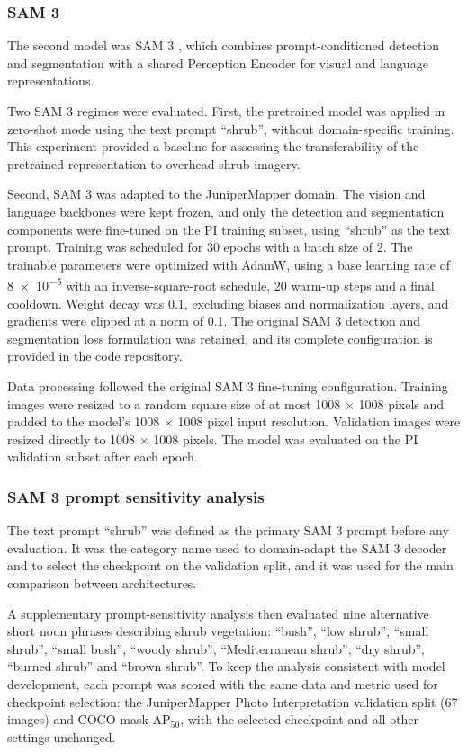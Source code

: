 \documentclass[12pt,a4paper]{article}
\begin{document}
\subsubsection{SAM 3}

The second model was SAM 3 \citep{carion2026sam3}, which combines prompt-conditioned detection and segmentation with a shared Perception Encoder for visual and language representations.

Two SAM 3 regimes were evaluated. First, the pretrained model was applied in zero-shot mode using the text prompt ``shrub'', without domain-specific training. This experiment provided a baseline for assessing the transferability of the pretrained representation to overhead shrub imagery.

Second, SAM 3 was adapted to the JuniperMapper domain. The vision and language backbones were kept frozen, and only the detection and segmentation components were fine-tuned on the PI training subset, using ``shrub'' as the text prompt. Training was scheduled for 30 epochs with a batch size of 2. The trainable parameters were optimized with AdamW, using a base learning rate of \num{8e-5} with an inverse-square-root schedule, 20 warm-up steps and a final cooldown. Weight decay was 0.1, excluding biases and normalization layers, and gradients were clipped at a norm of 0.1. The original SAM 3 detection and segmentation loss formulation was retained, and its complete configuration is provided in the code repository.

Data processing followed the original SAM 3 fine-tuning configuration. Training images were resized to a random square size of at most 1008 $\times$ 1008 pixels and padded to the model's 1008 $\times$ 1008 pixel input resolution. Validation images were resized directly to 1008 $\times$ 1008 pixels. The model was evaluated on the PI validation subset after each epoch.

\subsubsection{SAM 3 prompt sensitivity analysis}

The text prompt ``shrub'' was defined as the primary SAM 3 prompt before any evaluation. It was the category name used to domain-adapt the SAM 3 decoder and to select the checkpoint on the validation split, and it was used for the main comparison between architectures.

A supplementary prompt-sensitivity analysis then evaluated nine alternative short noun phrases describing shrub vegetation: ``bush'', ``low shrub'', ``small shrub'', ``small bush'', ``woody shrub'', ``Mediterranean shrub'', ``dry shrub'', ``burned shrub'' and ``brown shrub''. To keep the analysis consistent with model development, each prompt was scored with the same data and metric used for checkpoint selection: the JuniperMapper Photo Interpretation validation split (67 images) and COCO mask AP$_{50}$, with the selected checkpoint and all other settings unchanged.
\end{document}

